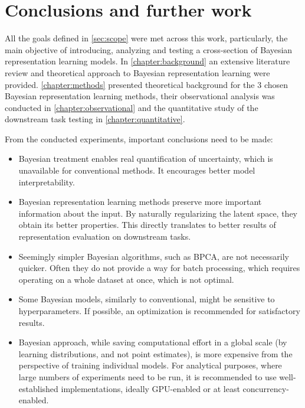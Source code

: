 \chapter{Conclusions and further work}\label{chapter:conclusion}
\thispagestyle{chapterBeginStyle}
All the goals defined in \autoref{sec:scope} were met across this work, particularly, the main objective of introducing, analyzing and testing a cross-section of Bayesian representation learning models. In \autoref{chapter:background} an extensive literature review and theoretical approach to Bayesian representation learning were provided. \autoref{chapter:methods} presented theoretical background for the 3 chosen Bayesian representation learning methods, their observational analysis was conducted in \autoref{chapter:observational} and the quantitative study of the downstream task testing in \autoref{chapter:quantitative}.

\vspace{\baselineskip}
From the conducted experiments, important conclusions need to be made:

\begin{itemize}
    \item Bayesian treatment enables real quantification of uncertainty, which is unavailable for conventional methods. It encourages better model interpretability.
    \item Bayesian representation learning methods preserve more important information about the input. By naturally regularizing the latent space, they obtain its better properties. This directly translates to better results of representation evaluation on downstream tasks.
    \item Seemingly simpler Bayesian algorithms, such as BPCA, are not necessarily quicker. Often they do not provide a way for batch processing, which requires operating on a whole dataset at once, which is not optimal.    
    \item Some Bayesian models, similarly to conventional, might be sensitive to hyperparameters. If possible, an optimization is recommended for satisfactory results.
    \item Bayesian approach, while saving computational effort in a global scale (by learning distributions, and not point estimates), is more expensive from the perspective of training individual models. For analytical purposes, where large numbers of experiments need to be run, it is recommended to use well-established implementations, ideally GPU-enabled or at least concurrency-enabled.
\end{itemize}

